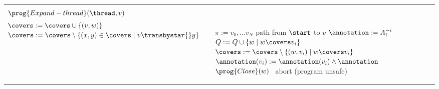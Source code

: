 \documentclass[conference]{IEEEtran}
\begin{document}
\vspace{-.25cm}

\begin{algorithm*}
\vspace{-.25cm}
\begin{tabular}{p{}p{}p{}}
\begin{algorithmic}[1]
\footnotesize

\Procedure {main}{$ $}
	\State $Q := \{ \epsilon \}$, $\covers := \emptyset$
	\While { $Q \neq \emptyset$}
		\State select and remove $v$ from $Q$
		\State $\prog{Close}(v)$
		\If {$v$ not covered}
			\If { $error(v)$ }
	 			\State $\prog{Refine}(v)$
			\EndIf
  		\State $\prog{Expand}(v)$
		\EndIf
	\EndWhile
	\State
	\Return $\program$ is safe
\EndProcedure  \\
\Procedure {expand}{$v$}
    \For { $ \thread \in \threads$}
		\State $\prog{Expand-thread}(\thread,v)$
    \EndFor
\EndProcedure 
\end{algorithmic}
&
\begin{algorithmic}[1]
\footnotesize

\makeatletter\setcounter{ALG@line}{14}\makeatother

\Procedure {expand-thread}{$\thread, v$}
  
    \State $(\locvec,\annotation) := v$
    	\For { $(l,N) \in \actions(\thread)$ with $\locvec_\thread=l$}
		\For { $(R,l') \in N$}
		\State $w:=$ fresh node 
    		\State $\locvec(w):=\locvec[\thread\mapsto l']$
      		\State $\annotation(w) := \mathit{True}$
      		\State $Q := Q \cup \{w\}$, $V := V \cup \{w\}$
      		\State $\transby {} := \transby {} \cup \{ (v,\thread,R,w) \}$   \label{algo:impact:expand:trans}
		\EndFor
   	\EndFor
\EndProcedure 
\\
\Procedure {close}{$v$}
  \For {$w \in V^{\prec v}:$ $w$ uncovered}
         \If {$\locvec(v)=\locvec(w) \wedge \annotation(v) \Rightarrow \annotation(w)$}
        		\State $\covers := \covers \cup \{ (v,w) \}$
         		\State $\covers := \covers \setminus \{(x,y)\in \covers \mid v \transbystar{} y \}$
         \EndIf	
  \EndFor
\EndProcedure


\end{algorithmic}
&
\begin{algorithmic}[1]
\footnotesize

\makeatletter\setcounter{ALG@line}{29}\makeatother

\Procedure {refine}{$v$}
  \If  {$v$ not error node or $\annotation(v) \equiv \mathit{False}$}
    \State \Return
  \EndIf 
	\State $\pi :=v_0,\ldots v_N $  path from $\start$ to $v$
	\If {$\formula(\pi)$ has interpolant $A_0 \ldots A_N$ }
			\For { $ i = 0 \ldots N$}
				\State $\annotation := A_i^{-i}$
				\If {$\annotation(v_i) \not \vDash \annotation$}
					\State $Q := Q \cup \{ w \mid w \covers v_i \}$
					\State $\covers := \covers \setminus \{ (w,v_i) \mid w \covers v_i \}$
					\State $\annotation(v_i) := \annotation(v_i) \wedge \annotation$
				\EndIf
			\EndFor
      \For { $w \in V$ s.t. $w \transbystar{} v$}
      	\State $\prog{Close}(w)$
      \EndFor
	\Else
		\State \ abort (program unsafe)
	\EndIf


\end{algorithmic}
\end{tabular}
\end{algorithm*}
\end{document}
